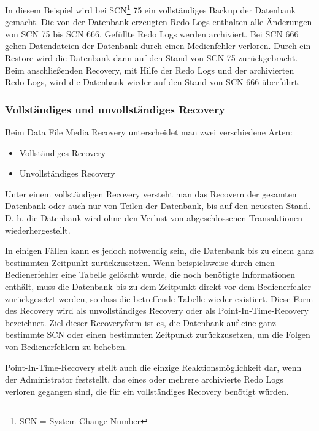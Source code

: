 
          In diesem Beispiel wird bei SCN\footnote{SCN = System Change Number} 75 ein vollständiges Backup der Datenbank gemacht. Die von der Datenbank erzeugten Redo Logs enthalten alle Änderungen von SCN 75 bis SCN 666. Gefüllte Redo Logs werden archiviert. Bei SCN 666 gehen Datendateien der Datenbank durch einen Medienfehler verloren. Durch ein Restore wird die Datenbank dann auf den Stand von SCN 75 zurückgebracht. Beim anschließenden Recovery, mit Hilfe der Redo Logs und der archivierten Redo Logs, wird die Datenbank wieder auf den Stand von SCN 666 überführt.
        \subsubsection{Vollständiges und unvollständiges Recovery}
          Beim Data File Media Recovery unterscheidet man zwei verschiedene Arten:
          \begin{itemize}
            \item Vollständiges Recovery
            \item Unvollständiges Recovery
          \end{itemize}
          \begin{merke}
            Unter einem vollständigen Recovery versteht man das Recovern der gesamten Datenbank oder auch nur von Teilen der Datenbank, bis auf den neuesten Stand. D. h. die Datenbank wird ohne den Verlust von abgeschlossenen Transaktionen wiederhergestellt.
          \end{merke}

          In einigen Fällen kann es jedoch notwendig sein, die Datenbank bis
          zu einem ganz bestimmten Zeitpunkt zurückzusetzen. Wenn
          beispielsweise durch einen Bedienerfehler eine Tabelle gelöscht
          wurde, die noch benötigte Informationen enthält, muss die
          Datenbank bis zu dem Zeitpunkt direkt vor dem Bedienerfehler
          zurückgesetzt werden, so dass die betreffende Tabelle wieder
          existiert.
\clearpage
          Diese Form des Recovery wird als unvollständiges Recovery
          oder als Point-In-Time-Recovery bezeichnet. Ziel dieser Recoveryform
          ist es, die Datenbank auf eine ganz bestimmte SCN oder einen
          bestimmten Zeitpunkt zurückzusetzen, um die Folgen von
          Bedienerfehlern zu beheben.

          Point-In-Time-Recovery stellt auch die einzige Reaktionsmöglichkeit dar, wenn der Administrator feststellt, das eines oder mehrere archivierte Redo Logs verloren gegangen sind, die für ein vollständiges Recovery benötigt würden.

